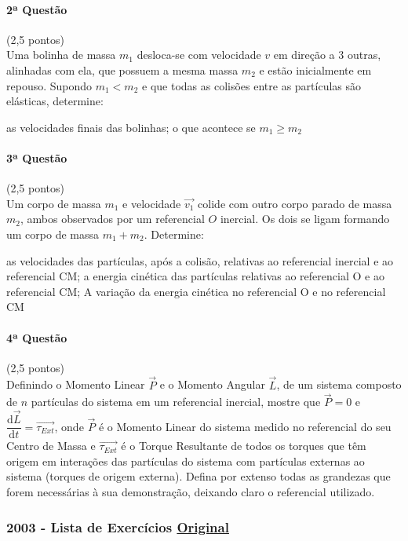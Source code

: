 \documentclass[12pt,a4paper]{article}
\newcommand{\dd}{\mathrm{d}}
\newcommand{\original}[1]{\tiny \href{#1}{Original} \normalsize}
\begin{document}
\paragraph{2ª Questão} (2,5 pontos)\\
Uma bolinha de massa $m_1$ desloca-se com velocidade $v$ em direção a 3 outras, alinhadas com ela, que possuem a mesma massa $m_2$ e estão inicialmente em repouso. Supondo $m_1 < m_2$ e que todas as colisões entre as partículas são elásticas, determine:
\begin{tasks}
\task as velocidades finais das bolinhas;
\task o que acontece se $m_1 \ge m_2$
\end{tasks}

\paragraph{3ª Questão} (2,5 pontos)\\
Um corpo de massa $m_1$ e velocidade $\overrightarrow{v_1}$ colide com outro corpo parado de massa $m_2$, ambos observados por um referencial $O$ inercial. Os dois se ligam formando um corpo de massa $m_1 + m_2$. Determine:
\begin{tasks}
\task as velocidades das partículas, após a colisão, relativas ao referencial inercial e ao referencial CM;
\task a energia cinética das partículas relativas ao referencial O e ao referencial CM;
\task A variação da energia cinética no referencial O e no referencial CM
\end{tasks}

\paragraph{4ª Questão} (2,5 pontos)\\
Definindo o Momento Linear $\overrightarrow{P}$ e o Momento Angular $\overrightarrow{L}$, de um sistema composto de $n$ partículas do sistema em um referencial inercial, mostre que $\overrightarrow{P} = 0$ e $\dfrac{\dd \overrightarrow{L}}{\dd t} = \overrightarrow{\tau _{Ext}}$, onde $\overrightarrow{P}$ é o Momento Linear do sistema medido no referencial do seu Centro de Massa e $\overrightarrow{\tau _{Ext}}$ é o Torque Resultante de todos os torques que têm origem em interações das partículas do sistema com partículas externas ao sistema (torques de origem externa). Defina por extenso todas as grandezas que forem necessárias à sua demonstração, deixando claro o referencial utilizado.
\newpage
\subsubsection{2003 - Lista de Exercícios \original{https://drive.google.com/open?id=1OqYX1h_cbI4DNim9YMLSBSbIpLETelhT}}
\end{document}
